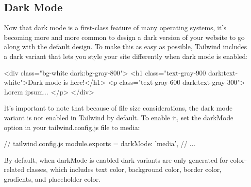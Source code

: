 \documentclass{report}
\begin{document}
    \bigbreak \noindent 
    \subsection{Dark Mode}
    \bigbreak \noindent 
    Now that dark mode is a first-class feature of many operating systems, it’s becoming more and more common to design a dark version of your website to go along with the default design.
    \bigbreak \noindent 
    To make this as easy as possible, Tailwind includes a dark variant that lets you style your site differently when dark mode is enabled:

    \bigbreak \noindent 
    \begin{htmlcode}
<div class="bg-white dark:bg-gray-800">
  <h1 class="text-gray-900 dark:text-white">Dark mode is here!</h1>
  <p class="text-gray-600 dark:text-gray-300">
    Lorem ipsum...
  </p>
</div>
    \end{htmlcode}
    \bigbreak \noindent 
    It’s important to note that because of file size considerations, the dark mode variant is not enabled in Tailwind by default.
    \bigbreak \noindent 
    To enable it, set the darkMode option in your tailwind.config.js file to media:
    \bigbreak \noindent 
    \begin{cppcode}
        // tailwind.config.js
        module.exports = {
            darkMode: 'media',
            // ...
        }
    \end{cppcode}
    \bigbreak \noindent 
    By default, when darkMode is enabled dark variants are only generated for color-related classes, which includes text color, background color, border color, gradients, and placeholder color.





























     
\end{document}
